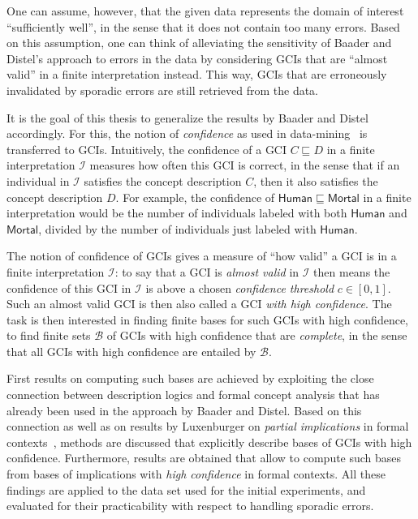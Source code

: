\documentclass[english,fleqn]{scrartcl}
\begin{document}
One can assume, however, that the given data represents the domain of interest
\enquote{sufficiently well}, in the sense that it does not contain too many errors.  Based
on this assumption, one can think of alleviating the sensitivity of Baader and Distel's
approach to errors in the data by considering GCIs that are \enquote{almost valid} in a
finite interpretation instead.  This way, GCIs that are erroneously invalidated by
sporadic errors are still retrieved from the data.

It is the goal of this thesis to generalize the results by Baader and Distel accordingly.
For this, the notion of \emph{confidence} as used in
data-mining~\cite{arules:agrawal:association-rules} is transferred to GCIs.  Intuitively,
the confidence of a GCI $C \sqsubseteq D$ in a finite interpretation $\mathcal{I}$
measures how often this GCI is correct, in the sense that if an individual in
$\mathcal{I}$ satisfies the concept description $C$, then it also satisfies the concept
description $D$.  For example, the confidence of $\mathsf{Human} \sqsubseteq
\mathsf{Mortal}$ in a finite interpretation would be the number of individuals labeled
with both $\mathsf{Human}$ and $\mathsf{Mortal}$, divided by the number of individuals
just labeled with $\mathsf{Human}$.

The notion of confidence of GCIs gives a measure of \enquote{how valid} a GCI is in a
finite interpretation $\mathcal{I}$: to say that a GCI is \emph{almost valid} in
$\mathcal{I}$ then means the confidence of this GCI in $\mathcal{I}$ is above a chosen
\emph{confidence threshold} $c \in [0,1]$.  Such an almost valid GCI is then also called a
GCI \emph{with high confidence}.  The task is then interested in finding finite bases for
such GCIs with high confidence, \ie to find finite sets $\mathcal{B}$ of GCIs with high
confidence that are \emph{complete}, in the sense that all GCIs with high confidence are
entailed by $\mathcal{B}$.

First results on computing such bases are achieved by exploiting the close connection
between description logics and formal concept analysis that has already been used in the
approach by Baader and Distel.  Based on this connection as well as on results by
Luxenburger on \emph{partial implications} in formal contexts~\cite{diss:Luxenburger},
methods are discussed that explicitly describe bases of GCIs with high confidence.
Furthermore, results are obtained that allow to compute such bases from bases of
implications with \emph{high confidence} in formal contexts.  All these findings are
applied to the data set used for the initial experiments, and evaluated for their
practicability with respect to handling sporadic errors.
\end{document}
